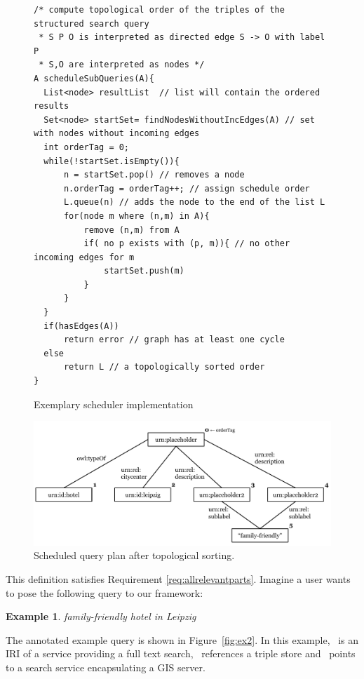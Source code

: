 \documentclass{acm_proc_article-sp}
\newtheorem{ex}{Example}
\begin{document}
\begin{figure}[p!]
\lstset{language=Java}
\begin{lstlisting}[frame=single]
/* compute topological order of the triples of the structured search query 
 * S P O is interpreted as directed edge S -> O with label P 
 * S,O are interpreted as nodes */
A scheduleSubQueries(A){
  List<node> resultList  // list will contain the ordered results
  Set<node> startSet= findNodesWithoutIncEdges(A) // set with nodes without incoming edges
  int orderTag = 0;
  while(!startSet.isEmpty()){
      n = startSet.pop() // removes a node 
      n.orderTag = orderTag++; // assign schedule order
      L.queue(n) // adds the node to the end of the list L
      for(node m where (n,m) in A){
          remove (n,m) from A
          if( no p exists with (p, m)){ // no other incoming edges for m
              startSet.push(m) 
          }
      }
  }
  if(hasEdges(A))
      return error // graph has at least one cycle
  else 
      return L // a topologically sorted order
}
\end{lstlisting}
\caption{Exemplary scheduler implementation}
\label{fig:scheduler}
\end{figure}

\begin{figure}[p!tb]
\centering
\includegraphics[width=\textwidth]{query_plan_tree.pdf}
\caption{Scheduled query plan after topological sorting.}
\label{queryplantree}
\end{figure}



This definition satisfies Requirement \ref{req:allrelevantparts}.
Imagine a user wants to pose the following query to our framework: 
\begin{ex}
family-friendly hotel in Leipzig
\label{ex:obama}
\end{ex}

The annotated example query is shown in Figure~\ref{fig:ex2}.
In this example, \ssfulltext\ is an IRI of a service providing a full text search, \sstriplestore\ references a triple store and \ssgeo\ points to a search service encapsulating a GIS server.
\end{document}
